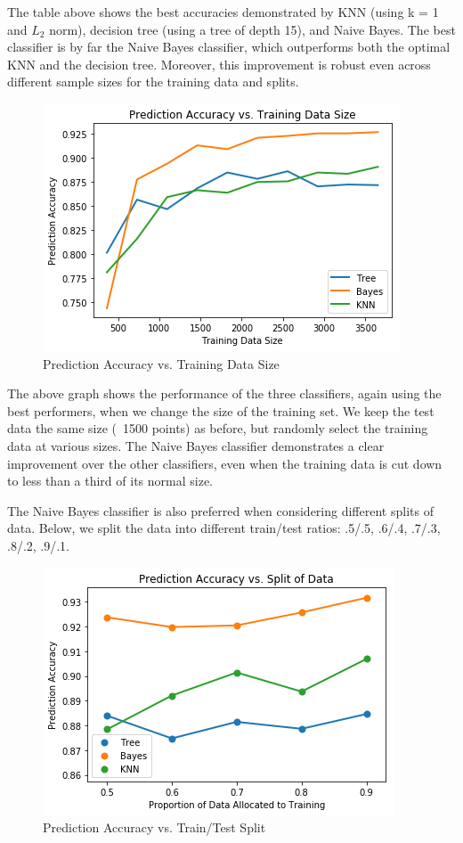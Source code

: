 \documentclass[twoside,11pt]{homework}
\begin{document}
	The table above shows the best accuracies demonstrated by KNN (using k = 1 and $L_2$ norm), decision tree (using a tree of depth 15), and Naive Bayes. The best classifier is by far the Naive Bayes classifier, which outperforms both the optimal KNN and the decision tree. Moreover, this improvement is robust even across different sample sizes for the training data and splits.
	
	
	\begin{figure}[H]
		\centering
		\includegraphics[scale=.5]{q6_fig/learning_curve.png}	
		\caption{Prediction Accuracy vs. Training Data Size}
	\end{figure}
	
	The above graph shows the performance of the three classifiers, again using the best performers, when we change the size of the training set. We keep the test data the same size (~1500 points) as before, but randomly select the training data at various sizes. The Naive Bayes classifier demonstrates a clear improvement over the other classifiers, even when the training data is cut down to less than a third of its normal size. 
	
	The Naive Bayes classifier is also preferred when considering different splits of data. Below, we split the data into different train/test ratios: .5/.5, .6/.4, .7/.3, .8/.2, .9/.1.
	
		\begin{figure}[H]
		\centering
		\includegraphics[scale=.5]{q6_fig/split.png}	
		\caption{Prediction Accuracy vs. Train/Test Split}
	\end{figure}
\end{document}
